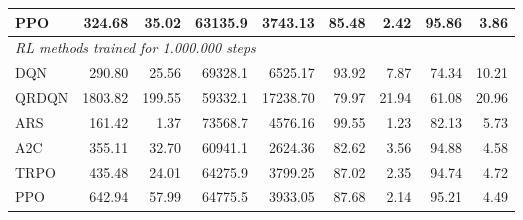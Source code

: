 \begin{samepage}
\begin{center}
\begin{tabular}{l|rr|rr|rr|rr}
    PPO          &   324.68 &    35.02 &    63135.9 &    3743.13 &   85.48 &    2.42 &   95.86 &    3.86 \\
    \midrule
    \multicolumn{9}{l}{\textit{RL methods trained for 1.000.000 steps}} \\
    \midrule
    DQN          &   290.80 &    25.56 &    69328.1 &    6525.17 &   93.92 &    7.87 &   74.34 &   10.21 \\
    QRDQN        &  1803.82 &   199.55 &    59332.1 &   17238.70 &   79.97 &   21.94 &   61.08 &   20.96 \\
    ARS          &   161.42 &     1.37 &    73568.7 &    4576.16 &   99.55 &    1.23 &   82.13 &    5.73 \\
    A2C          &   355.11 &    32.70 &    60941.1 &    2624.36 &   82.62 &    3.56 &   94.88 &    4.58 \\
    TRPO         &   435.48 &    24.01 &    64275.9 &    3799.25 &   87.02 &    2.35 &   94.74 &    4.72 \\
    PPO          &   642.94 &    57.99 &    64775.5 &    3933.05 &   87.68 &    2.14 &   95.21 &    4.49 \\
    \bottomrule
  \end{tabular}
\end{center}
\end{samepage}

